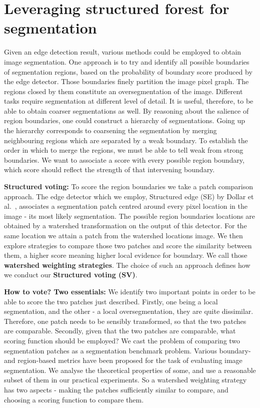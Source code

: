 \chapter{Leveraging structured forest for segmentation}
\label{Chapter4}
Given an edge detection result, various methods could be employed to obtain image segmentation.  One approach is to try and identify all possible boundaries of segmentation regions, based on the probability of boundary score produced by the edge detector. Those boundaries finely partition the image pixel graph. The regions closed by them constitute an oversegmentation of the image. Different tasks require segmentation at different level of detail. It is useful, therefore, to be able to obtain coarser segmentations as well. By reasoning about the salience of region boundaries, one could construct a hierarchy of segmentations. Going up the hierarchy corresponds to coarsening the segmentation by merging neighbouring regions which are separated by a weak boundary. To establish the order in which to merge the regions, we must be able to tell weak from strong boundaries. We want to associate a score with every possible region boundary, which score should reflect the strength of that intervening boundary.

\textbf{Structured voting:} To score the region boundaries we take a patch comparison approach. The edge detector which we employ, Structured edge (SE) by Dollar et al.~\cite{DollarICCV13edges}, associates a segmentation patch centred around every pixel location in the image - its most likely segmentation. The possible region boundaries locations are obtained by a watershed transformation on the output of this detector. For the same location we attain a patch from the watershed locations image. We then explore strategies to compare those two patches and score the similarity between them, a higher score meaning higher local evidence for boundary. We call those \textbf{watershed weighting strategies}. The choice of such an approach defines how we conduct our \textbf{Structured voting (SV)}.

\textbf{How to vote? Two essentials:} We identify two important points in order to be able to score the two patches just described. Firstly, one being a local segmentation, and the other - a local oversegmentation, they are quite dissimilar. Therefore, one patch needs to be sensibly transformed, so that the two patches are comparable. Secondly, given that the two patches are comparable, what scoring function should be employed? We cast the problem of comparing two segmentation patches as a segmentation benchmark problem. Various boundary- and region-based metrics have been proposed for the task of evaluating image segmentation. We analyse the theoretical properties of some, and use a reasonable subset of them in our practical experiments. So a watershed weighting strategy has two aspects - making the patches sufficiently similar to compare, and choosing a scoring function to compare them.

